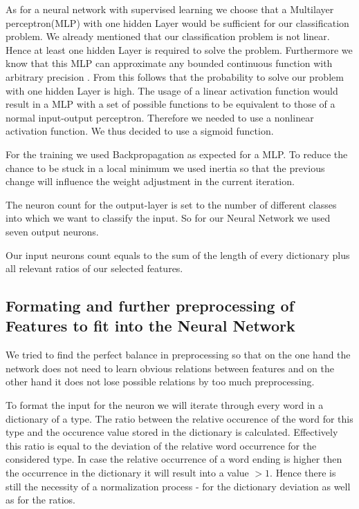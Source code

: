 \documentclass[paper=A4,pagesize=auto,12pt,headinclude=true,footinclude=true,BCOR=0mm,DIV=calc]{scrartcl}
\begin{document}
	As for a neural network with supervised learning we choose that a Multilayer perceptron(MLP) with one hidden Layer would be sufficient for our classification problem. We already mentioned that our classification problem is not linear. Hence at least one hidden Layer is required to solve the problem. Furthermore we know that this MLP can approximate any bounded continuous function with arbitrary precision \cite{ApproximateAnyFunction}. From this follows that the probability to solve our problem with one hidden Layer is high.
	The usage of a linear activation function would result in a MLP with a set of possible functions to be equivalent to those of a normal input-output perceptron. Therefore we needed to use a nonlinear activation function. We thus decided to use a sigmoid function. 
	
	For the training we used Backpropagation as expected for a MLP. To reduce the chance to be stuck in a local minimum we used inertia so that the previous change will influence the weight adjustment in the current iteration.
	
	The neuron count for the output-layer is set to the number of different classes into which we want to classify the input. So for our Neural Network we used seven output neurons.
	
	Our input neurons count equals to the sum of the length of every dictionary plus all relevant ratios of our selected features.
	
	\subsection{Formating and further preprocessing of Features to fit into the Neural Network}
	We tried to find the perfect balance in preprocessing so that on the one hand the network does not need to learn obvious relations between features and on the other hand it does not lose possible relations by too much preprocessing.
	
	
	To format the input for the neuron we will iterate through every word in a dictionary of a type. The ratio between the relative occurence of the word for this type and the occurence value stored in the dictionary is calculated. Effectively this ratio is equal to the deviation of the relative word occurrence for the considered type. In case the relative occurrence of a word ending is higher then the occurrence in the dictionary it will result into a value $> 1$. Hence there is still the necessity of a normalization process - for the dictionary deviation as well as for the ratios.
	
\end{document}
